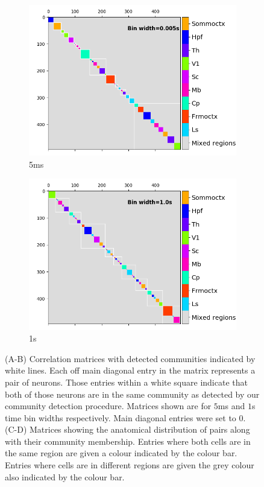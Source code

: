 \begin{figure}[p]
\begin{subfigure}[h]{0.5\linewidth}
      \includegraphics[width=\linewidth]{figures/eight_probe/Krebs_0p005_regional_cluster_map.png}
      \caption{5ms}
      \label{fig:regional_cluster_map_5ms}
    \end{subfigure}
    \begin{subfigure}[h]{0.5\linewidth}
      \includegraphics[width=\linewidth]{figures/eight_probe/Krebs_1p0_regional_cluster_map.png}
      \caption{1s}
      \label{fig:regional_cluster_map_1s}
    \end{subfigure}
    \caption{(A-B) Correlation matrices with detected communities indicated by white lines. Each off main diagonal entry in the matrix represents a pair of neurons. Those entries within a white square indicate that both of those neurons are in the same community as detected by our community detection procedure. Matrices shown are for $5$ms and $1$s time bin widths respectively. Main diagonal entries were set to $0$. (C-D) Matrices showing the anatomical distribution of pairs along with their community membership. Entries where both cells are in the same region are given a colour indicated by the colour bar. Entries where cells are in different regions are given the grey colour also indicated by the colour bar.}
    \label{fig:consensus_clusterings_with_regions}
  \end{figure}

